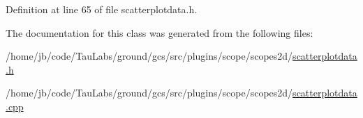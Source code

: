 \-Definition at line 65 of file scatterplotdata.\-h.



\-The documentation for this class was generated from the following files\-:\begin{DoxyCompactItemize}
\item 
/home/jb/code/\-Tau\-Labs/ground/gcs/src/plugins/scope/scopes2d/\hyperlink{scatterplotdata_8h}{scatterplotdata.\-h}\item 
/home/jb/code/\-Tau\-Labs/ground/gcs/src/plugins/scope/scopes2d/\hyperlink{scatterplotdata_8cpp}{scatterplotdata.\-cpp}\end{DoxyCompactItemize}
